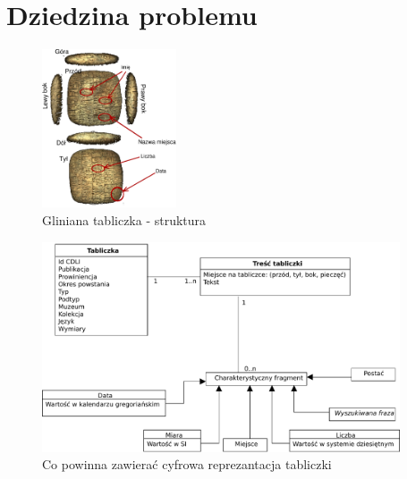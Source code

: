 \section{Dziedzina problemu}

\begin{figure}
 \centering
 \includegraphics[width=150px]{../diagramy/tabliczka.pdf}
 \caption{\label{fig:tabliczka}Gliniana tabliczka - struktura}
\end{figure}



\begin{figure}
 \centering
 \includegraphics[width=400px]{../diagramy/Model-dziedziny.pdf}
 \caption{Co powinna zawierać cyfrowa reprezantacja tabliczki}
\end{figure}
~ 

